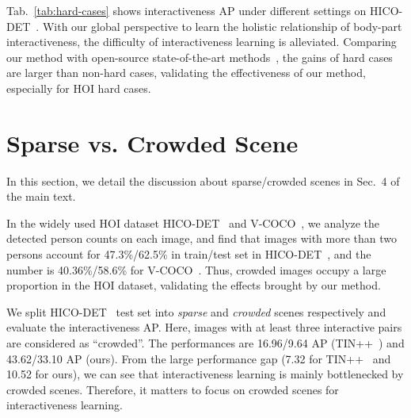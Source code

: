 \documentclass[runningheads]{llncs}
\begin{document}
Tab.~\ref{tab:hard-cases} shows interactiveness AP under different settings on HICO-DET~\cite{hicodet}.
With our global perspective to learn the holistic relationship of body-part interactiveness, the difficulty of interactiveness learning is alleviated. Comparing our method with open-source state-of-the-art methods~\cite{li2021transferable,ppdm,qpic,cdn}, the gains of hard cases are larger than non-hard cases, validating the effectiveness of our method, especially for HOI hard cases.

\begin{table}
\centering
\caption{Interactiveness AP under different settings.}
\label{tab:hard-cases}
\end{table}


\section{Sparse vs. Crowded Scene}
In this section, we detail the discussion about sparse/crowded scenes in Sec.~4 of the main text.

In the widely used HOI dataset HICO-DET~\cite{hicodet} and V-COCO~\cite{vcoco}, we analyze the detected person counts on each image, and find that images with more than two persons account for 47.3\%/62.5\% in train/test set in HICO-DET~\cite{hicodet}, and the number is 40.36\%/58.6\% for V-COCO~\cite{vcoco}. Thus, crowded images occupy a large proportion in the HOI dataset, validating the effects brought by our method. 

We split HICO-DET~\cite{hicodet} test set into \textit{sparse} and \textit{crowded} scenes respectively and evaluate the interactiveness AP. Here, images with at least three interactive pairs are considered as ``crowded''. The performances are 16.96/9.64 AP (TIN++~\cite{li2021transferable}) and  43.62/33.10 AP (ours). From the large performance gap (7.32 for TIN++~\cite{li2021transferable} and 10.52 for ours), we can see that interactiveness learning is mainly bottlenecked by crowded scenes. Therefore, it matters to focus on crowded scenes for interactiveness learning.
\end{document}
